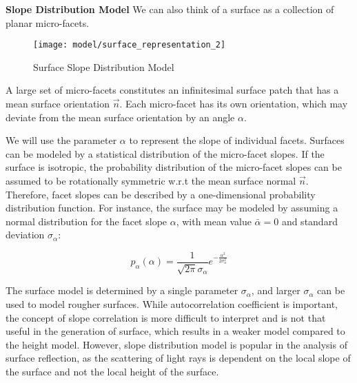 



\textbf{Slope Distribution Model} We can also think of a surface as a collection of planar micro-facets.

\begin{figure}[h]
\centering
\texttt{[image: model/surface\_representation\_2]}
\caption{Surface Slope Distribution Model}
\end{figure}

A large set of micro-facets constitutes an infinitesimal surface patch that has a mean surface orientation $\vec{n}$. Each micro-facet has its own orientation, which may deviate from the mean surface orientation by an angle $\alpha$. 

We will use the parameter $\alpha$ to represent the slope of individual facets. Surfaces can be modeled by a statistical distribution of the micro-facet slopes. If the surface is isotropic, the probability distribution of the micro-facet slopes can be assumed to be rotationally symmetric w.r.t the mean surface normal $\vec{n}$.  Therefore, facet slopes can be described by a one-dimensional probability distribution function. For instance, the surface may be modeled by assuming a normal distribution for the facet slope $\alpha$, with mean value $\bar{\alpha}=0$ and standard deviation $\sigma_\alpha$:

$$
p_\alpha(\alpha)=\frac{1}{\sqrt{2\pi}\sigma_\alpha}e^{-\frac{\alpha^2}{2\sigma_\alpha^2}}
$$

The surface model is determined by a single parameter $\sigma_\alpha$, and larger $\sigma_\alpha$ can be used to model rougher surfaces. While autocorrelation coefficient is important, the concept of slope correlation is more difficult to interpret and is not that useful in the generation of surface, which results in a weaker model compared to the height model. However, slope distribution model is popular in the analysis of surface reflection, as the scattering of light rays is dependent on the local slope of the surface and not the local height of the surface.

